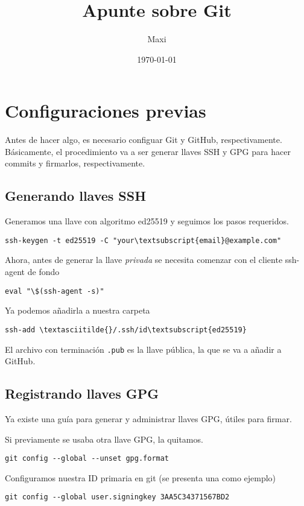 \documentclass[11pt]{article}
\author{Maxi}
\date{\today}
\title{Apunte sobre Git}
\begin{document}
\maketitle
\tableofcontents


\section{Configuraciones previas}
\label{sec:org1b819f4}

Antes de hacer algo, es necesario configuar Git y GitHub,
respectivamente. Básicamente, el procedimiento va a ser generar llaves
SSH y GPG para hacer commits y firmarlos, respectivamente.

\subsection{Generando llaves SSH}
\label{sec:org0ac80e1}

Generamos una llave con algoritmo ed25519 y seguimos los pasos requeridos.
\begin{verbatim}
ssh-keygen -t ed25519 -C "your\textsubscript{email}@example.com"
\end{verbatim}

Ahora, antes de generar la llave \emph{privada} se necesita comenzar con el
cliente ssh-agent de fondo
\begin{verbatim}
eval "\$(ssh-agent -s)"
\end{verbatim}

Ya podemos añadirla a nuestra carpeta
\begin{verbatim}
ssh-add \textasciitilde{}/.ssh/id\textsubscript{ed25519}
\end{verbatim}

El archivo con terminación \texttt{.pub} es la llave pública, la que se va a
añadir a GitHub.

\subsection{Registrando llaves GPG}
\label{sec:org7e4285a}

Ya existe una guía para generar y administrar llaves GPG, útiles para
firmar.

Si previamente se usaba otra llave GPG, la quitamos.
\begin{verbatim}
git config --global --unset gpg.format
\end{verbatim}

Configuramos nuestra ID primaria en git (se presenta una como ejemplo)
\begin{verbatim}
git config --global user.signingkey 3AA5C34371567BD2
\end{verbatim}
\end{document}
